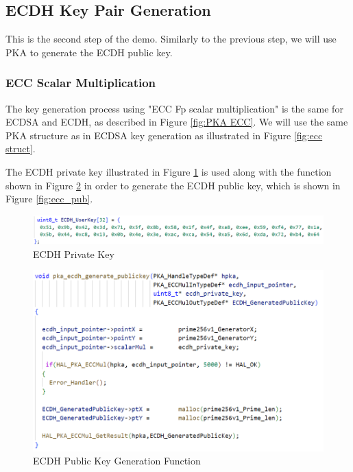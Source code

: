 \subsection{ECDH Key Pair Generation}
This is the second step of the demo. Similarly to the previous step, we will use PKA to generate the ECDH public key.

    \subsubsection{ECC Scalar Multiplication}
    The key generation process using "ECC Fp scalar multiplication" is the same for ECDSA and ECDH, as described in Figure \ref{fig:PKA ECC}. We will use the same PKA structure as in ECDSA key generation as illustrated in Figure \ref{fig:ecc struct}.

    The ECDH private key illustrated in Figure \ref{fig:ecdh_priv} is used along with the function shown in Figure \ref{fig:ecc_generate} in order to generate the ECDH public key, which is shown in Figure \ref{fig:ecc_pub}.
    \begin{figure}[H]
    \centering
    \includegraphics[width=15cm]{img/ecdh private}
    \caption{ECDH Private Key}
    \label{fig:ecdh_priv}
    \end{figure}

    \begin{figure}[H]
    \centering
    \includegraphics[width=13cm]{img/ecdh generate.png}
    \caption{ECDH Public Key Generation Function}
    \label{fig:ecc_generate}
    \end{figure}

